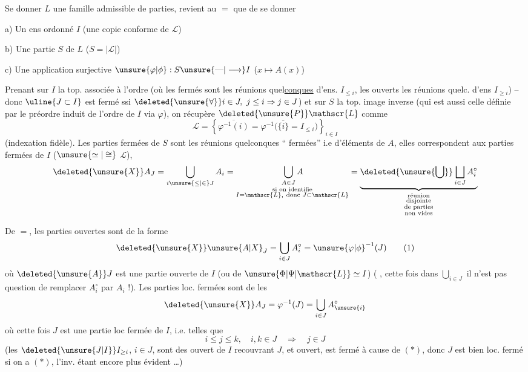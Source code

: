 Se donner  $L$ une famille admissible  de parties, revient au $=$ que de se donner

a) Un ens ordonné $I$ \qquad (une copie conforme de $\mathscr{L}$)

b) Une partie $S$ de $L$ \qquad ($S=|\mathscr{L}|$)

c) Une application surjective $\unsure{\varphi|\phi}:S\unsure{\text{---}|\longrightarrow}I$ \quad ($x\mapsto A(x)$)

Prenant sur $I$ la top. associée à l'ordre (où les fermés sont les réunions quel\uline{conques} d'ens. $I_{\leq i}$, les ouverts les réunions quelc. d'ens $I_{\geq i}$) -- donc $\uline{\ensuremath{J\subset I}}$ est fermé ssi $\deleted{\unsure{\forall}}i\in J,\ j\leq i\Rightarrow j\in J$) et sur $S$ la top. image inverse (qui est aussi celle définie par le préordre induit de l'ordre de $I$ via $\varphi$),  on récupère $\deleted{\unsure{P}}\mathscr{L}$ comme
\[
 \mathscr{L}=\left\{\overline{\varphi^{-1}(i)}=\varphi^{-1}
 \bigl(\overline{\{i\}}=I_{\leq i}\bigr)\right\}_{i\in I}
\]
(indexation fidèle). Les parties fermées de $S$ sont les réunions quelconques  `` fermées'' i.e d'éléments de $A$, elles correspondent  aux parties fermées  de $I$ ($\unsure{\simeq|\cong}$  $\mathscr{L}$),  
\[
\deleted{\unsure{X}}A_J=\bigcup_{i\unsure{\leq|\in}J}A_i
 =\underset{\substack{\text{si on identifie}\\I=\mathscr{L},\ \text{donc }J\subset\mathscr{L}}}{\bigcup_{A\in J} A}
 =\underbrace{\deleted{\unsure{\bigcup}}\bigsqcup_{i\in J}A_i^\circ}_{\substack{\text{réunion}\\\text{disjointe}\\\text{de parties}\\\text{non vides}}}
\]
 

De $=$, les parties ouvertes sont  de
la forme
\[
 \deleted{\unsure{X}}\unsure{A|X}_J=\bigcup_{i\in J}A_i^\circ={\unsure{\varphi|\phi}}^{-1}(J)
 \tag*{(1)}
\]
où $\deleted{\unsure{A}}J$ est une partie ouverte de $I$ (ou de $\unsure{\Phi|\Psi|\mathscr{L}}\simeq I$) ( , cette fois dans $\displaystyle\bigcup_{i\in J}$ il n'est pas question de remplacer $A_i^\circ$ par $A_i$ !). Les parties loc. fermées sont de  les
\[
 \deleted{\unsure{X}}A_J=\varphi^{-1}(J)=\bigcup_{i\in J}A_{\unsure{i}}^\circ
\]
où cette fois $J$ est une partie loc fermée de $I$, i.e. telles que
\[
 i\leq j\leq k,\quad i,k\in J\quad\Rightarrow\quad j\in J
 \tag*{$(*)$}
\]
(les $\deleted{\unsure{J|I}}I_{\geq i}$, $i\in J$, sont des ouvert de $I$ recouvrant $J$, et  ouvert,  est fermé  à cause de $(*)$, donc $J$ est bien loc. fermé si on a $(*)$, l'inv. étant encore plus évident \ldots)

